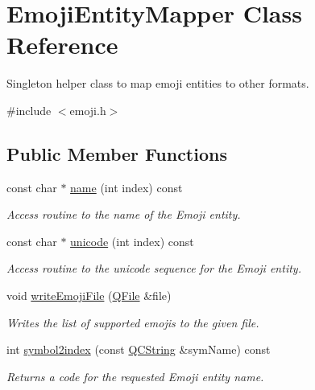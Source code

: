 \hypertarget{class_emoji_entity_mapper}{}\section{Emoji\+Entity\+Mapper Class Reference}
\label{class_emoji_entity_mapper}


Singleton helper class to map emoji entities to other formats.  




{\ttfamily \#include $<$emoji.\+h$>$}

\subsection*{Public Member Functions}
\begin{DoxyCompactItemize}
\item 
const char $\ast$ \mbox{\hyperlink{class_emoji_entity_mapper_a33137ef11c5d63f6f7d7a27c01db943e}{name}} (int index) const
\begin{DoxyCompactList}\small\item\em Access routine to the name of the Emoji entity. \end{DoxyCompactList}\item 
const char $\ast$ \mbox{\hyperlink{class_emoji_entity_mapper_a1b6d7e3d1f82adf44c46fdd82d11b2f8}{unicode}} (int index) const
\begin{DoxyCompactList}\small\item\em Access routine to the unicode sequence for the Emoji entity. \end{DoxyCompactList}\item 
\mbox{\label{class_emoji_entity_mapper_a0f8ca7e7e237deb36fedf301bb84551c}} 
void \mbox{\hyperlink{class_emoji_entity_mapper_a0f8ca7e7e237deb36fedf301bb84551c}{write\+Emoji\+File}} (\mbox{\hyperlink{class_q_file}{Q\+File}} \&file)
\begin{DoxyCompactList}\small\item\em Writes the list of supported emojis to the given file. \end{DoxyCompactList}\item 
int \mbox{\hyperlink{class_emoji_entity_mapper_a48541059ca5ed1d155c65e4b6b69fe24}{symbol2index}} (const \mbox{\hyperlink{class_q_c_string}{Q\+C\+String}} \&sym\+Name) const
\begin{DoxyCompactList}\small\item\em Returns a code for the requested Emoji entity name. \end{DoxyCompactList}\end{DoxyCompactItemize}
